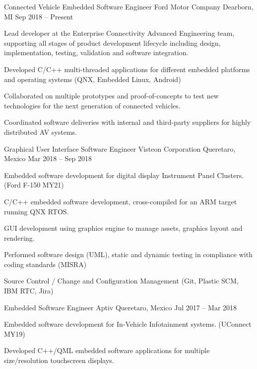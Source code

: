 \documentclass[]{awesome-cv}
\begin{document}
\vspace{-7mm}
\begin{cventries}
	\cventry
	{Connected Vehicle Embedded Software Engineer}
	{Ford Motor Company}
	{Dearborn, MI}
	{Sep 2018 – Present}
	{\begin{cvitems}
		\item {Lead developer at the Enterprise Connectivity Advanced Engineering team, supporting all stages of product development lifecycle including design, implementation, testing, validation and software integration.}
		\item {Developed C/C++ multi-threaded applications for different embedded platforms and operating systems (QNX, Embedded Linux, Android)}
		\item {Collaborated on multiple prototypes and proof-of-concepts to test new technologies for the next generation of connected vehicles.}
		\item {Coordinated software deliveries with internal and third-party suppliers for highly distributed AV systems.}
		\end{cvitems}}
	\cventry
	{Graphical User Interface Software Engineer}
	{Visteon Corporation}
	{Queretaro, Mexico}
	{Mar 2018 – Sep 2018}
	{\begin{cvitems}
		\item {Embedded software development for digital display Instrument Panel Clusters. (Ford F-150 MY21)}
		\item {C/C++ embedded software development, cross-compiled for an ARM target running QNX RTOS.}
		\item {GUI development using graphics engine to manage assets, graphics layout and rendering.}
		\item {Performed software design (UML), static and dynamic testing in compliance with coding standards (MISRA)}
		\item {Source Control / Change and Configuration Management (Git, Plastic SCM, IBM RTC, Jira) }
		\end{cvitems}}
	\cventry
	{Embedded Software Engineer}
	{Aptiv}
	{Queretaro, Mexico}
	{Jul 2017 – Mar 2018}
	{\begin{cvitems}
		\item {Embedded software development for In-Vehicle Infotainment systems. (UConnect MY19)}
		\item {Developed C++/QML embedded software applications for multiple size/resolution touchscreen displays.
}
\end{cvitems}}
\end{cventries}
\end{document}
